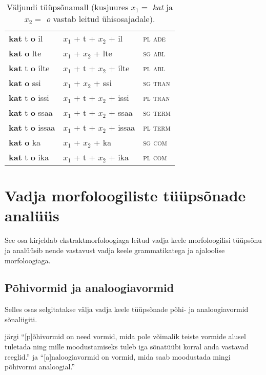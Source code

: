 \documentclass[12pt,a4paper]{article}
\begin{document}
\begin{table}[H]
\begin{minipage}[t]{.55\textwidth}
\begin{tabular}[t]{l l l}
      \textbf{kat} t \textbf{o} il    & $x_1$ + t + $x_2$ + il    & \textsc{pl ade} \\
      \textbf{kat}   \textbf{o} lte   & $x_1$ + $x_2$ + lte       & \textsc{sg abl} \\
      \textbf{kat} t \textbf{o} ilte  & $x_1$ + t + $x_2$ + ilte  & \textsc{pl abl} \\
      \textbf{kat}   \textbf{o} ssi   & $x_1$ + $x_2$ + ssi       & \textsc{sg tran} \\
      \textbf{kat} t \textbf{o} issi  & $x_1$ + t + $x_2$ + issi  & \textsc{pl tran} \\
      \textbf{kat} t \textbf{o} ssaa  & $x_1$ + t + $x_2$ + ssaa  & \textsc{sg term} \\
      \textbf{kat} t \textbf{o} issaa & $x_1$ + t + $x_2$ + issaa & \textsc{pl term} \\
      \textbf{kat}   \textbf{o} ka    & $x_1$ + $x_2$ + ka        & \textsc{sg com} \\
      \textbf{kat} t \textbf{o} ika   & $x_1$ + t + $x_2$ + ika   & \textsc{pl com} \\
    \end{tabular}
    \caption{Väljundi tüüpsõnamall (kus\-juures $x_1 = $ \textit{kat} ja $x_2 = $ \textit{o} vastab leitud ühisosajadale).}
    \label{tab:väljundtabel_katto}
  \end{minipage}
\end{table}








\newpage
\section{Vadja morfoloogiliste tüüpsõnade analüüs}
\label{sec:analüüs}

See osa kirjeldab ekstraktmorfoloogiaga leitud vadja keele morfoloogilisi tüüpsõnu ja analüüsib nende vastavust vadja keele grammatikatega ja ajaloolise morfoloogiaga.




\subsection{Põhivormid ja analoogiavormid}

Selles osas selgitatakse välja vadja keele tüüpsõnade põhi- ja analoogiavormid sõnaliigiti.

\cite{erelt_eesti_2007} järgi ``[p]õhivormid on need vormid, mida pole võimalik teiste vormide alusel tuletada ning mille moodustamiseks tuleb iga sõnatüübi korral anda vastavad reeglid.'' ja ``[a]naloogiavormid on vormid, mida saab moodustada mingi põhivormi analoogial.''
\end{document}
